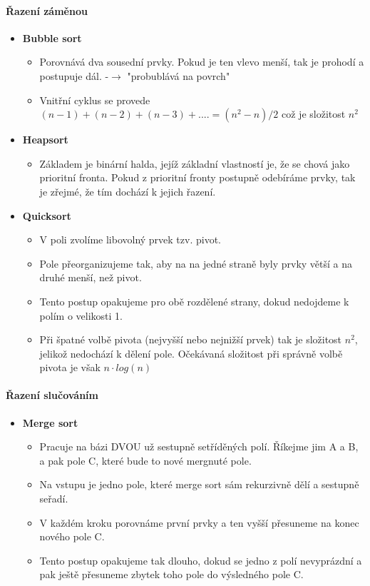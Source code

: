 \documentclass[10pt,a4paper]{article}
\begin{document}
\paragraph{Řazení záměnou}
\begin{itemize}
\item \textbf{Bubble sort}
\begin{itemize}
\item Porovnává dva sousední prvky. Pokud je ten vlevo menší, tak je prohodí a postupuje dál. -$\rightarrow$ "probublává na povrch"
\item Vnitřní cyklus se provede $(n-1) + (n-2) + (n-3) +.... = (n^2 - n)/2$ což je složitost $n^2$
\end{itemize}
\item \textbf{Heapsort}
\begin{itemize}
\item Základem je binární halda, jejíž základní vlastností je, že se chová jako prioritní fronta. Pokud z prioritní fronty postupně odebíráme prvky, tak je zřejmé, že tím dochází k jejich řazení.
\end{itemize}
\item \textbf{Quicksort}
\begin{itemize}
\item V poli zvolíme libovolný prvek tzv. pivot.
\item Pole přeorganizujeme tak, aby na na jedné straně byly prvky větší a na druhé menší, než pivot.
\item Tento postup opakujeme pro obě rozdělené strany, dokud nedojdeme k polím o velikosti 1.
\item Při špatné volbě pivota (nejvyšší nebo nejnižší prvek) tak je složitost $n^2$, jelikož nedochází k dělení pole. Očekávaná složitost při správně volbě pivota je však $n \cdot log(n)$
\end{itemize}
\end{itemize}
\paragraph{Řazení slučováním}
\begin{itemize}
\item \textbf{Merge sort}
\begin{itemize}
\item Pracuje na bázi DVOU už sestupně setříděných polí. Říkejme jim A a B, a pak pole C, které bude to nové mergnuté pole.
\item Na vstupu je jedno pole, které merge sort sám rekurzivně dělí a sestupně seřadí.
\item V každém kroku porovnáme první prvky a ten vyšší přesuneme na konec nového pole C.
\item Tento postup opakujeme tak dlouho, dokud se jedno z polí nevyprázdní a pak ještě přesuneme zbytek toho pole do výsledného pole C.
\end{itemize}
\end{itemize}
\end{document}
